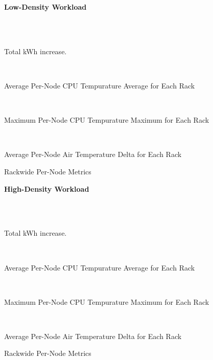 \documentclass[10pt]{report}
\begin{document}
\begin{table}[!h]
  \centering
   \centerline{\bfseries Low-Density Workload}\\\hline
   \vspace{1cm}
   \\
   \vspace{0.5cm}
   \centerline{Total kWh increase.}
   \vspace{1cm}
   \\
   \vspace{0.5cm}
   \centerline{Average Per-Node CPU Tempurature Average for Each Rack}
   \vspace{1cm}
   \\
   \vspace{0.5cm}
   \centerline{Maximum Per-Node CPU Tempurature Maximum for Each Rack}
   \vspace{1cm}
   \\
   \vspace{0.5cm}
   \centerline{Average Per-Node Air Temperature Delta for Each Rack}
    \caption{Rackwide Per-Node Metrics}
\end{table}
\begin{table}[!h]
  \centering
   \centerline{\bfseries High-Density Workload}\\\hline
   \vspace{1cm}
   \\
   \vspace{0.5cm}
   \centerline{Total kWh increase.}
   \vspace{1cm}
   \\
   \vspace{0.5cm}
   \centerline{Average Per-Node CPU Tempurature Average for Each Rack}
   \vspace{1cm}
   \\
   \vspace{0.5cm}
   \centerline{Maximum Per-Node CPU Tempurature Maximum for Each Rack}
   \vspace{1cm}
   \\
   \vspace{0.5cm}
   \centerline{Average Per-Node Air Temperature Delta for Each Rack}
    \caption{Rackwide Per-Node Metrics}
\end{table}
\end{document}
